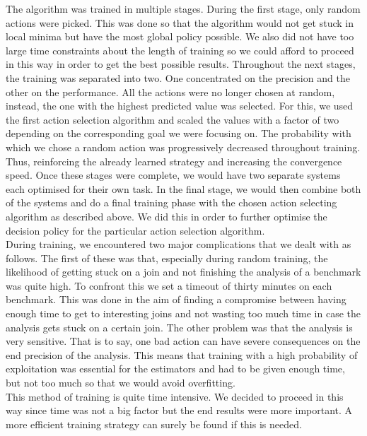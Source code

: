 The algorithm was trained in multiple stages. During the first stage, only random actions were picked. This was done so that the algorithm would not get stuck in local minima but have the most global policy possible. We also did not have too large time constraints about the length of training so we could afford to proceed in this way in order to get the best possible results. Throughout the next stages, the training was separated into two. One concentrated on the precision and the other on the performance. All the actions were no longer chosen at random, instead, the one with the highest predicted value was selected. For this, we used the first action selection algorithm and scaled the values with a factor of two depending on the corresponding goal we were focusing on. The probability with which we chose a random action was progressively decreased throughout training. Thus, reinforcing the already learned strategy and increasing the convergence speed. Once these stages were complete, we would have two separate systems each optimised for their own task. In the final stage, we would then combine both of the systems and do a final training phase with the chosen action selecting algorithm as described above. We did this in order to further optimise the decision policy for the particular action selection algorithm.\\
During training, we encountered two major complications that we dealt with as follows. The first of these was that, especially during random training, the likelihood of getting stuck on a join and not finishing the analysis of a benchmark was quite high. To confront this we set a timeout of thirty minutes on each benchmark. This was done in the aim of finding a compromise between having enough time to get to interesting joins and not wasting too much time in case the analysis gets stuck on a certain join. The other problem was that the analysis is very sensitive. That is to say, one bad action can have severe consequences on the end precision of the analysis. This means that training with a high probability of exploitation was essential for the estimators and had to be given enough time, but not too much so that we would avoid overfitting.\\
This method of training is quite time intensive. We decided to proceed in this way since time was not a big factor but the end results were more important. A more efficient training strategy can surely be found if this is needed.



















